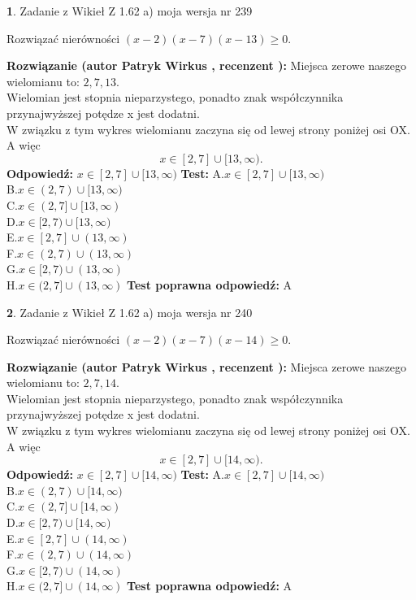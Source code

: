 \documentclass[12pt, a4paper]{article}
\theoremstyle{definition} %
\newtheorem{zad}{}
\newcommand{\zadStart}[1]{\begin{zad}#1\newline}
\newcommand{\zadStop}{\end{zad}}
\newcommand{\rozwStart}[2]{\noindent \textbf{Rozwiązanie (autor #1 , recenzent #2): }\newline}
\newcommand{\rozwStop}{\newline}
\newcommand{\odpStart}{\noindent \textbf{Odpowiedź:}\newline}
\newcommand{\odpStop}{\newline}
\newcommand{\testStart}{\noindent \textbf{Test:}\newline}
\newcommand{\testStop}{\newline}
\newcommand{\kluczStart}{\noindent \textbf{Test poprawna odpowiedź:}\newline}
\newcommand{\kluczStop}{\newline}
\begin{document}
\zadStart{Zadanie z Wikieł Z 1.62 a) moja wersja nr 239}

Rozwiązać nierówności $(x-2)(x-7)(x-13)\ge0$.
\zadStop
\rozwStart{Patryk Wirkus}{}
Miejsca zerowe naszego wielomianu to: $2, 7, 13$.\\
Wielomian jest stopnia nieparzystego, ponadto znak współczynnika przy\linebreak najwyższej potędze x jest dodatni.\\ W związku z tym wykres wielomianu zaczyna się od lewej strony poniżej osi OX. A więc $$x \in [2,7] \cup [13,\infty).$$
\rozwStop
\odpStart
$x \in [2,7] \cup [13,\infty)$
\odpStop
\testStart
A.$x \in [2,7] \cup [13,\infty)$\\
B.$x \in (2,7) \cup [13,\infty)$\\
C.$x \in (2,7] \cup [13,\infty)$\\
D.$x \in [2,7) \cup [13,\infty)$\\
E.$x \in [2,7] \cup (13,\infty)$\\
F.$x \in (2,7) \cup (13,\infty)$\\
G.$x \in [2,7) \cup (13,\infty)$\\
H.$x \in (2,7] \cup (13,\infty)$
\testStop
\kluczStart
A
\kluczStop



\zadStart{Zadanie z Wikieł Z 1.62 a) moja wersja nr 240}

Rozwiązać nierówności $(x-2)(x-7)(x-14)\ge0$.
\zadStop
\rozwStart{Patryk Wirkus}{}
Miejsca zerowe naszego wielomianu to: $2, 7, 14$.\\
Wielomian jest stopnia nieparzystego, ponadto znak współczynnika przy\linebreak najwyższej potędze x jest dodatni.\\ W związku z tym wykres wielomianu zaczyna się od lewej strony poniżej osi OX. A więc $$x \in [2,7] \cup [14,\infty).$$
\rozwStop
\odpStart
$x \in [2,7] \cup [14,\infty)$
\odpStop
\testStart
A.$x \in [2,7] \cup [14,\infty)$\\
B.$x \in (2,7) \cup [14,\infty)$\\
C.$x \in (2,7] \cup [14,\infty)$\\
D.$x \in [2,7) \cup [14,\infty)$\\
E.$x \in [2,7] \cup (14,\infty)$\\
F.$x \in (2,7) \cup (14,\infty)$\\
G.$x \in [2,7) \cup (14,\infty)$\\
H.$x \in (2,7] \cup (14,\infty)$
\testStop
\kluczStart
A
\kluczStop
\end{document}
